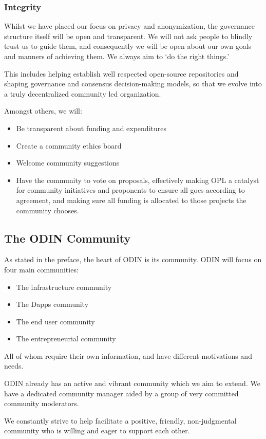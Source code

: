 \subsubsection{​Integrity}

Whilst we have placed our focus on privacy and anonymization, the governance structure itself will be open and transparent. We will not ask people to blindly trust us to guide them, and consequently we will be open about our own goals and manners of achieving them. We always aim to `do the right things.'

This includes helping establish well respected open-source repositories and shaping governance and consensus decision-making models, so that we evolve into a truly decentralized community led organization.

Amongst others, we will:
\begin{itemize}
   \item Be transparent about funding and expenditures
   \item Create a community ethics board
   \item Welcome community suggestions
   \item Have the community to vote on proposals, effectively making OPL a catalyst for community initiatives and proponents to ensure all goes according to agreement, and making sure all funding is allocated to those projects the community chooses.
\end{itemize}
   
\subsection{​The ODIN Community}
As stated in the preface, the heart of ODIN is its community. ODIN will focus on four main communities:
\begin{itemize}
   \item The infrastructure community
   \item The Dapps community
   \item The end user community 
   \item The entrepreneurial community
\end{itemize}
All of whom require their own information, and have different motivations and needs.

ODIN already has an active and vibrant community which we aim to extend. We have a dedicated community manager aided by a group of very committed community moderators.

We constantly strive to help facilitate a positive, friendly, non-judgmental community who is willing and eager to support each other. 

